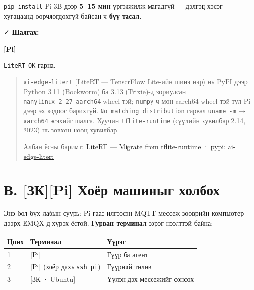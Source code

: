 \texttt{pip\ install} Pi 3B дээр \textbf{5--15 мин} үргэлжилж магадгүй --- дэлгэц хэсэг хугацаанд өөрчлөгдөхгүй байсан ч \textbf{бүү тасал}.

✓ \textbf{Шалгах:}

\textbf{{[}Pi{]}}

\begin{Shaded}
\begin{Highlighting}[]
\end{Highlighting}
\end{Shaded}

\texttt{LiteRT\ OK} гарна.

\begin{quote}
\texttt{ai-edge-litert} (LiteRT --- TensorFlow Lite-ийн шинэ нэр) нь PyPI дээр Python 3.11 (Bookworm) ба 3.13 (Trixie)-д зориулсан \texttt{manylinux\_\allowbreak{}2\_\allowbreak{}27\_\allowbreak{}aarch64} wheel-тэй; \texttt{numpy} ч мөн aarch64 wheel-тэй тул Pi дээр эх кодоос барихгүй. \texttt{No\ matching\ distribution} гарвал \texttt{uname\ -m} → \texttt{aarch64} эсэхийг шалга. Хуучин \texttt{tflite-runtime} (сүүлийн хувилбар 2.14, 2023) нь зөвхөн нөөц хувилбар.

Албан ёсны баримт: \href{https://ai.google.dev/edge/litert/migration}{LiteRT --- Migrate from tflite-runtime} · \href{https://pypi.org/project/ai-edge-litert/}{pypi: ai-edge-litert}
\end{quote}

\hypertarget{ux432.-ux437ux43api-ux445ux43eux451ux440-ux43cux430ux448ux438ux43dux44bux433-ux445ux43eux43bux431ux43eux445}{%
\section{В. {[}ЗК{]}{[}Pi{]} Хоёр машиныг холбох}\label{ux432.-ux437ux43api-ux445ux43eux451ux440-ux43cux430ux448ux438ux43dux44bux433-ux445ux43eux43bux431ux43eux445}}

Энэ бол бүх лабын суурь: Pi-гаас илгээсэн MQTT мессеж зөөврийн компьютер дээрх EMQX-д хүрэх ёстой. \textbf{Гурван терминал} зэрэг нээлттэй байна:

\begingroup\scriptsize\begin{longtable}[]{@{}lll@{}}
\toprule
Цонх & Терминал & Үүрэг\tabularnewline
\midrule
\endhead
1 & {[}Pi{]} & Гүүр ба агент\tabularnewline
2 & {[}Pi{]} (хоёр дахь \texttt{ssh\ pi}) & Гүүрний төлөв\tabularnewline
3 & {[}ЗК · Ubuntu{]} & Үүлэн дэх мессежийг сонсох\tabularnewline
\bottomrule
\end{longtable}\endgroup

